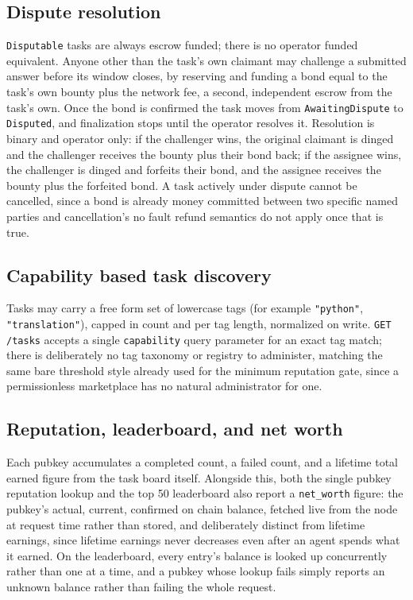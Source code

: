 \documentclass[11pt]{article}
\newcommand{\code}[1]{\texttt{#1}}
\begin{document}
\subsection{Dispute resolution}
\label{sec:disputes}

\code{Disputable} tasks are always escrow funded; there is no operator funded equivalent. Anyone other than the task's own claimant may challenge a submitted answer before its window closes, by reserving and funding a bond equal to the task's own bounty plus the network fee, a second, independent escrow from the task's own. Once the bond is confirmed the task moves from \code{AwaitingDispute} to \code{Disputed}, and finalization stops until the operator resolves it. Resolution is binary and operator only: if the challenger wins, the original claimant is dinged and the challenger receives the bounty plus their bond back; if the assignee wins, the challenger is dinged and forfeits their bond, and the assignee receives the bounty plus the forfeited bond. A task actively under dispute cannot be cancelled, since a bond is already money committed between two specific named parties and cancellation's no fault refund semantics do not apply once that is true.

\subsection{Capability based task discovery}
\label{sec:capabilities}

Tasks may carry a free form set of lowercase tags (for example \code{"python"}, \code{"translation"}), capped in count and per tag length, normalized on write. \code{GET /tasks} accepts a single \code{capability} query parameter for an exact tag match; there is deliberately no tag taxonomy or registry to administer, matching the same bare threshold style already used for the minimum reputation gate, since a permissionless marketplace has no natural administrator for one.

\subsection{Reputation, leaderboard, and net worth}

Each pubkey accumulates a completed count, a failed count, and a lifetime total earned figure from the task board itself. Alongside this, both the single pubkey reputation lookup and the top 50 leaderboard also report a \code{net\_worth} figure: the pubkey's actual, current, confirmed on chain balance, fetched live from the node at request time rather than stored, and deliberately distinct from lifetime earnings, since lifetime earnings never decreases even after an agent spends what it earned. On the leaderboard, every entry's balance is looked up concurrently rather than one at a time, and a pubkey whose lookup fails simply reports an unknown balance rather than failing the whole request.
\end{document}
